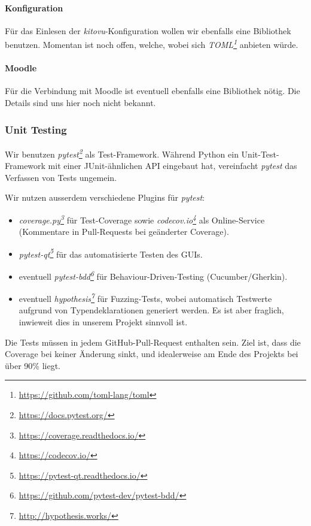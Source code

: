 \documentclass[a4paper]{article}
\newcommand{\tool}[2]{\emph{#1\footnote{\url{#2}}}}
\begin{document}
\paragraph{Konfiguration}

Für das Einlesen der \emph{kitovu}-Konfiguration wollen wir ebenfalls eine Bibliothek
benutzen. Momentan ist noch offen, welche, wobei sich \tool{TOML}{https://github.com/toml-lang/toml} anbieten würde.

\paragraph{Moodle}

Für die Verbindung mit Moodle ist eventuell ebenfalls eine Bibliothek nötig.
Die Details sind uns hier noch nicht bekannt.

\subsubsection{Unit Testing}

Wir benutzen \tool{pytest}{https://docs.pytest.org/} als Test-Framework. Während Python ein Unit-Test-Framework mit einer JUnit-ähnlichen API
eingebaut hat, vereinfacht \emph{pytest} das Verfassen von Tests ungemein.

Wir nutzen ausserdem verschiedene Plugins für \emph{pytest}:

\begin{itemize}
\item \tool{coverage.py}{https://coverage.readthedocs.io/} für
    Test-Coverage sowie \tool{codecov.io}{https://codecov.io/}
    als Online-Service (Kommentare in Pull-Requests bei geänderter Coverage).
\item \tool{pytest-qt}{https://pytest-qt.readthedocs.io/} für das
    automatisierte Testen des GUIs.
\item eventuell \tool{pytest-bdd}{https://github.com/pytest-dev/pytest-bdd/} für Behaviour-Driven-Testing (Cucumber/Gherkin).
\item eventuell \tool{hypothesis}{http://hypothesis.works/} für
  Fuzzing-Tests, wobei automatisch Testwerte aufgrund von Typendeklarationen
  generiert werden. Es ist aber fraglich, inwieweit dies in unserem Projekt sinnvoll ist.
\end{itemize}

Die Tests müssen in jedem GitHub-Pull-Request enthalten sein. Ziel ist, dass die
Coverage bei keiner Änderung sinkt, und idealerweise am Ende des Projekts bei
über 90\% liegt.
\end{document}
